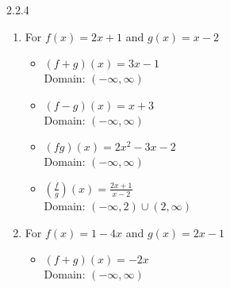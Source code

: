 \begin{Answer}{2.2.4}

	\begin{enumerate}

		\item For $f(x) = 2x+1$ and $g(x) = x-2$

		\begin{multicols}{2}

			\begin{itemize}

				\item $(f+g)(x) = 3x-1$ \\
				Domain: $(-\infty, \infty)$

				\vfill

				\columnbreak

				\item $(f-g)(x) = x+3$ \\
				Domain:  $(-\infty, \infty)$


			\end{itemize}

		\end{multicols}

		\begin{multicols}{2}

			\begin{itemize}

				\item $(fg)(x) = 2x^2-3x-2$ \\
				Domain: $(-\infty, \infty)$

				\vfill

				\columnbreak

				\item $\left(\frac{f}{g}\right)(x) = \frac{2x+1}{x-2}$ \\
				Domain:  $(-\infty, 2) \cup (2, \infty)$


			\end{itemize}

		\end{multicols}

		\item For $f(x) = 1-4x$ and $g(x) = 2x-1$

		\begin{multicols}{2}

			\begin{itemize}

				\item $(f+g)(x) = -2x$ \\
				Domain: $(-\infty, \infty)$


\end{itemize}
\end{multicols}
\end{enumerate}
\end{Answer}

